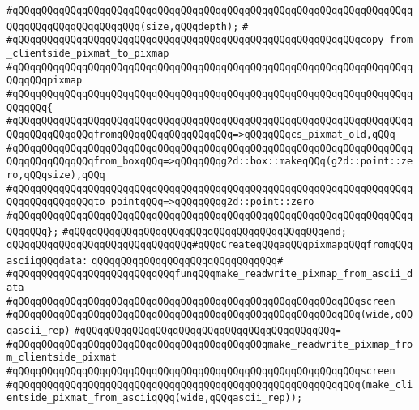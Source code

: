 \verb|#qQQqqQQqqQQqqQQqqQQqqQQqqQQqqQQqqQQqqQQqqQQqqQQqqQQqqQQqqQQqqQQqqQQqqQQqqQQqqQQqqQQqqQQqqQQq(size,qQQqdepth);|\newline
\verb|#|\newline
\verb|#qQQqqQQqqQQqqQQqqQQqqQQqqQQqqQQqqQQqqQQqqQQqqQQqqQQqqQQqqQQqcopy_from_clientside_pixmat_to_pixmap|\newline
\verb|#qQQqqQQqqQQqqQQqqQQqqQQqqQQqqQQqqQQqqQQqqQQqqQQqqQQqqQQqqQQqqQQqqQQqqQQqqQQqpixmap|\newline
\verb|#qQQqqQQqqQQqqQQqqQQqqQQqqQQqqQQqqQQqqQQqqQQqqQQqqQQqqQQqqQQqqQQqqQQqqQQqqQQq{|\newline
\verb|#qQQqqQQqqQQqqQQqqQQqqQQqqQQqqQQqqQQqqQQqqQQqqQQqqQQqqQQqqQQqqQQqqQQqqQQqqQQqqQQqqQQqfromqQQqqQQqqQQqqQQqqQQq=>qQQqqQQqcs_pixmat_old,qQQq|\newline
\verb|#qQQqqQQqqQQqqQQqqQQqqQQqqQQqqQQqqQQqqQQqqQQqqQQqqQQqqQQqqQQqqQQqqQQqqQQqqQQqqQQqqQQqfrom_boxqQQq=>qQQqqQQqg2d::box::makeqQQq(g2d::point::zero,qQQqsize),qQQq|\newline
\verb|#qQQqqQQqqQQqqQQqqQQqqQQqqQQqqQQqqQQqqQQqqQQqqQQqqQQqqQQqqQQqqQQqqQQqqQQqqQQqqQQqqQQqto_pointqQQq=>qQQqqQQqg2d::point::zero|\newline
\verb|#qQQqqQQqqQQqqQQqqQQqqQQqqQQqqQQqqQQqqQQqqQQqqQQqqQQqqQQqqQQqqQQqqQQqqQQqqQQq};|\newline
\verb|#qQQqqQQqqQQqqQQqqQQqqQQqqQQqqQQqqQQqqQQqqQQqend;|\newline
\newline
\newline
\verb|qQQqqQQqqQQqqQQqqQQqqQQqqQQqqQQq#qQQqCreateqQQqaqQQqpixmapqQQqfromqQQqasciiqQQqdata:|\newline
\verb|qQQqqQQqqQQqqQQqqQQqqQQqqQQqqQQq#|\newline
\verb|#qQQqqQQqqQQqqQQqqQQqqQQqqQQqfunqQQqmake_readwrite_pixmap_from_ascii_data|\newline
\verb|#qQQqqQQqqQQqqQQqqQQqqQQqqQQqqQQqqQQqqQQqqQQqqQQqqQQqqQQqqQQqscreen|\newline
\verb|#qQQqqQQqqQQqqQQqqQQqqQQqqQQqqQQqqQQqqQQqqQQqqQQqqQQqqQQqqQQq(wide,qQQqascii_rep)|\newline
\verb|#qQQqqQQqqQQqqQQqqQQqqQQqqQQqqQQqqQQqqQQqqQQq=|\newline
\verb|#qQQqqQQqqQQqqQQqqQQqqQQqqQQqqQQqqQQqqQQqqQQqmake_readwrite_pixmap_from_clientside_pixmat|\newline
\verb|#qQQqqQQqqQQqqQQqqQQqqQQqqQQqqQQqqQQqqQQqqQQqqQQqqQQqqQQqqQQqscreen|\newline
\verb|#qQQqqQQqqQQqqQQqqQQqqQQqqQQqqQQqqQQqqQQqqQQqqQQqqQQqqQQqqQQq(make_clientside_pixmat_from_asciiqQQq(wide,qQQqascii_rep));|\newline
